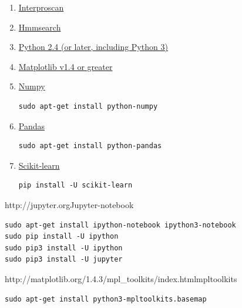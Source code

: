 \documentclass[12pt]{report}
\begin{document}
\begin{enumerate}
\item{\href{https://www.ebi.ac.uk/interpro/interproscan.htm}{Interproscan}}
\item{ \href{http://hmmer.org/}{Hmmsearch}}

\item{\href{https://www.python.org/downloads/}{Python 2.4 (or later, including
Python 3)
    }}

\item{\href{http://matplotlib.org/users/installing.html#most-platforms-
scientific-python-distributions}{Matplotlib v1.4 or greater}}

\item{\href{https://docs.scipy.org
/doc/numpy-1.10.0/user/install.html}{Numpy}}
\begin{verbatim}
sudo apt-get install python-numpy 
\end{verbatim}
\item{\href{http://pandas.pydata.org
/pandas-docs/stable/install.html}{Pandas}}
\begin{verbatim}
sudo apt-get install python-pandas 
\end{verbatim}
\item{\href{http://scikit-learn.org/stable/install.html}{Scikit-learn}}
\begin{verbatim}
pip install -U scikit-learn
\end{verbatim}
\end{enumerate}
\item {http://jupyter.org}{Jupyter-notebook}
\begin{verbatim}
sudo apt-get install ipython-notebook ipython3-notebook
sudo pip install -U ipython
sudo pip3 install -U ipython
sudo pip3 install -U jupyter
\end{verbatim}
\item {http://matplotlib.org/1.4.3/mpl_toolkits/index.html}{mpltoolkits}
\begin{verbatim}
sudo apt-get install python3-mpltoolkits.basemap
\end{verbatim}
\end{document}
